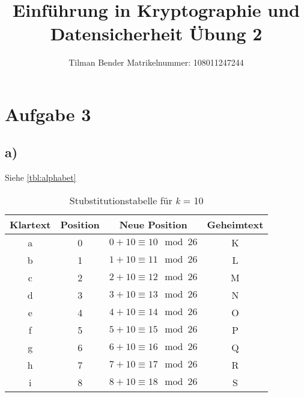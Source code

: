 \documentclass[10pt,a4paper]{article}
\author{Tilman Bender   Matrikelnummer: 108011247244\\}
\title{Einführung in Kryptographie und Datensicherheit Übung 2}
\begin{document}
\maketitle
\section*{Aufgabe 3}
\subsection*{a)}
Siehe \ref{tbl:alphabet}
\begin{table}[htdp]
\caption{Stubstitutionstabelle für \textsl{k} = 10}
\begin{center}
\begin{tabular}{|c|c|c|c|}
	Klartext & Position & Neue Position & Geheimtext\\ \hline
	a & 0 & \begin{math} 0 + 10 \equiv 10 \mod 26\end{math} & K \\ \hline
	b & 1 & \begin{math} 1 + 10 \equiv 11 \mod 26 \end{math} & L \\ \hline
	c & 2 & \begin{math} 2 + 10  \equiv 12  \mod 26 \end{math} & M \\ \hline
	d & 3 & \begin{math} 3 + 10  \equiv 13 \mod 26 \end{math}  & N \\ \hline
	e & 4 & \begin{math} 4 + 10 \equiv 14 \mod 26 \end{math}  & O \\ \hline
	f & 5 & \begin{math} 5 + 10 \equiv 15 \mod 26 \end{math}   & P \\ \hline
	g & 6 & \begin{math} 6 + 10 \equiv 16 \mod 26 \end{math}  & Q \\ \hline
	h & 7 & \begin{math} 7 + 10 \equiv 17 \mod 26 \end{math}  & R \\ \hline
	i & 8 & \begin{math} 8 + 10 \equiv 18 \mod 26 \end{math} & S \\ \hline

\end{tabular}
\end{center}
\end{table}
\end{document}
